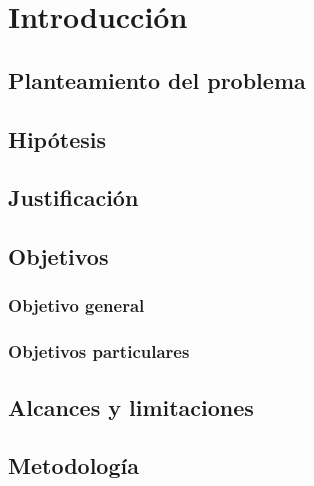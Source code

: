 \chapter{Introducción}

\section{Planteamiento del problema}

\section{Hipótesis}


\section{Justificación}


\section{Objetivos}

\subsection{Objetivo general}

\subsection{Objetivos particulares}

\section{Alcances y limitaciones}

\section{Metodología}
 








  





